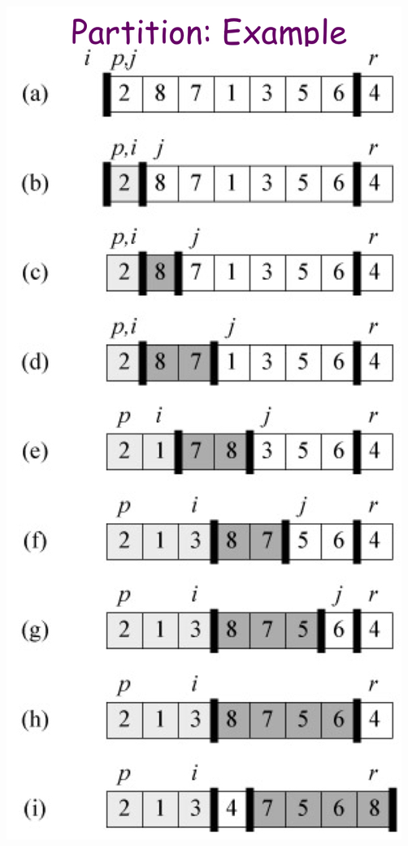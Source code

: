 \documentclass[11pt, a4paper]{COMP3711}
\begin{document}
\begin{spacing}{1.5}
    \begin{center}
        \includegraphics[scale=0.165]{images/03-partition-eg.jpeg}
    \end{center}


\end{spacing}
\end{document}
